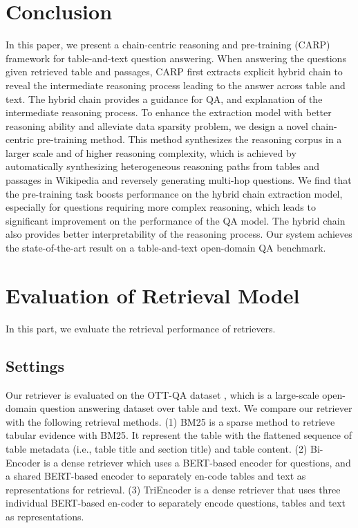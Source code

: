 \documentclass[11pt]{article}
\begin{document}
	\section{Conclusion}
	In this paper, we present a chain-centric reasoning and pre-training (CARP) framework for table-and-text question answering. 
	When answering the questions given retrieved table and passages, CARP first extracts explicit hybrid chain to reveal the intermediate reasoning process leading to the answer across table and text.
	The hybrid chain provides a guidance for QA, and explanation of the intermediate reasoning process. 
	To enhance the extraction model with better reasoning ability and alleviate data sparsity problem, we design a novel chain-centric pre-training method.
	This method synthesizes the reasoning corpus in a larger scale and of higher reasoning complexity, which is achieved by automatically synthesizing heterogeneous reasoning paths from tables and passages in Wikipedia and reversely generating multi-hop questions.
We find that the pre-training task boosts performance on the hybrid chain extraction model, especially for questions requiring more complex reasoning, which leads to significant improvement on the performance of the QA model. 
	The hybrid chain also provides better interpretability of the reasoning process.
	Our system achieves the state-of-the-art result on a table-and-text open-domain QA benchmark.



	
	
	\appendix
	\section{Evaluation of Retrieval Model}
	\label{appendix:retriever}
In this part, we evaluate the  retrieval performance of retrievers.
\subsection{Settings}  Our retriever is evaluated on the OTT-QA dataset \cite{chen2020open}, which is a large-scale open-domain question answering dataset over table and text. 
We compare our retriever with the following retrieval methods. (1) BM25 \cite{chen2020open} is a sparse method to retrieve tabular evidence with BM25. It represent the table with the flattened sequence of table metadata (i.e., table title and section title) and table content. (2) Bi-Encoder \cite{Kostic2021MultimodalRO} is a dense retriever  which  uses  a  BERT-based  encoder  for  questions, and a shared BERT-based encoder to separately en-code tables and text as representations for retrieval. (3) TriEncoder \cite{Kostic2021MultimodalRO} is a dense retriever that uses three individual BERT-based en-coder to separately encode questions, tables and text as representations.
\end{document}
